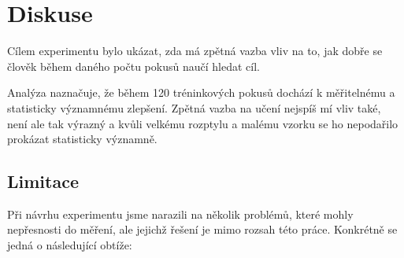 \chapter{Diskuse}

Cílem experimentu bylo ukázat, zda má zpětná vazba vliv na to, jak dobře se
člověk během daného počtu pokusů naučí hledat cíl.

Analýza naznačuje, že během 120 tréninkových pokusů dochází k měřitelnému a
statisticky významnému zlepšení. Zpětná vazba na učení nejspíš mí vliv také, není ale tak výrazný a kvůli velkému rozptylu a malému vzorku
se ho nepodařilo prokázat statisticky významně.


\section{Limitace}

Při návrhu experimentu jsme narazili na několik problémů, které mohly
nepřesnosti do měření, ale jejichž řešení je mimo rozsah této práce. Konkrétně
se jedná o následující obtíže:


